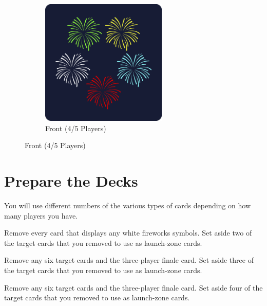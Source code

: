 \documentclass[a6paper, 12pt, parskip=half, DIV=14]{scrartcl}
\begin{document}
\begin{itemize}[nosep, leftmargin=*]
\begin{figure}[H]
\begin{subfigure}{0.3\textwidth}
				\centering
				 \includegraphics[width=0.66\textwidth]{Images/finale_card_5_display.png} 
				 \caption*{{\scriptsize Front (4/5 Players)}}
				 \end{subfigure}
			\end{figure}      
    \end{itemize}

\newpage
\enlargethispage{1.75\baselineskip}
\section*{Prepare the Decks}
You will use different numbers of the various types of cards depending on how many players you have.

  \begin{description}[leftmargin=0pt]
    \item[Three Players:] Remove every card that displays any white fireworks symbols. Set aside two of the target cards that you removed to use as launch-zone cards.

    \item[Four Players:] Remove any six target cards and the three-player finale card. Set aside three of the target cards that you removed to use as launch-zone cards.
    
    \item[Five Players:] Remove any six target cards and the three-player finale card. Set aside four of the target cards that you removed to use as launch-zone cards.
  \end{description}

\newpage
\enlargethispage{1.75\baselineskip}
\end{document}
